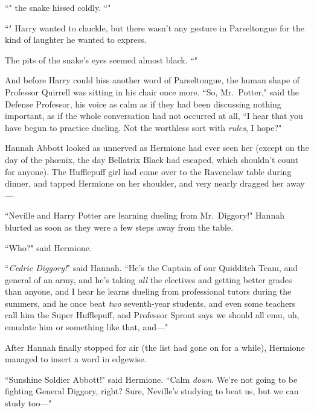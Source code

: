 ``" the snake hissed coldly. ``"

``" Harry wanted to chuckle, but there wasn't any gesture in Parseltongue for the kind of laughter he wanted to express.

The pits of the snake's eyes seemed almost black. ``"

And before Harry could hiss another word of Parseltongue, the human shape of Professor Quirrell was sitting in his chair once more. ``So, Mr.~Potter," said the Defense Professor, his voice as calm as if they had been discussing nothing important, as if the whole conversation had not occurred at all, ``I hear that you have begun to practice dueling. Not the worthless sort with \emph{rules}, I hope?"

\later

Hannah Abbott looked as unnerved as Hermione had ever seen her (except on the day of the phœnix, the day Bellatrix Black had escaped, which shouldn't count for anyone). The Hufflepuff girl had come over to the Ravenclaw table during dinner, and tapped Hermione on her shoulder, and very nearly dragged her away---

``Neville and Harry Potter are learning dueling from Mr.~Diggory!" Hannah blurted as soon as they were a few steps away from the table.

``Who?" said Hermione.

``\emph{Cedric Diggory!}" said Hannah. ``He's the Captain of our Quidditch Team, and general of an army, and he's taking \emph{all} the electives and getting better grades than anyone, and I hear he learns dueling from professional tutors during the summers, and he once beat \emph{two} seventh-year students, and even some teachers call him the Super Hufflepuff, and Professor Sprout says we should all emu, uh, emudate him or something like that, and---"

After Hannah finally stopped for air (the list had gone on for a while), Hermione managed to insert a word in edgewise.

``Sunshine Soldier Abbott!" said Hermione. ``Calm \emph{down}. We're not going to be fighting General Diggory, right? Sure, Neville's studying to beat us, but we can study too---"

